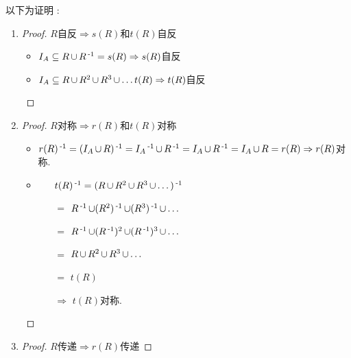 {{{  以下为证明 :

  \begin{enumerate}
    \item {
          \begin{proof}
            $R$自反$\Rightarrow s(R)$和$t(R)$自反

            \begin{itemize}
              \item $I_A \subseteq R \operatorname{\cup} R\operatorname{^{-1}} = s(R) \Rightarrow s(R)$自反
              \item $I_A \subseteq R \operatorname{\cup} R^2 \operatorname{\cup} R^3 \operatorname{\cup} \dots t(R) \Rightarrow t(R)$自反
            \end{itemize}
          \end{proof}
          }
    \item {
          \begin{proof}
            $R$对称$\Rightarrow r(R)$和$t(R)$对称

            \begin{itemize}
              \item $r(R)\operatorname{^{-1}} = (I_A \operatorname{\cup} R)\operatorname{^{-1}} = I_A\operatorname{^{-1}} \operatorname{\cup} R\operatorname{^{-1}} = I_A \operatorname{\cup} R\operatorname{^{-1}} = I_A \operatorname{\cup} R = r(R) \Rightarrow r(R)$对称.
              \item {
                    \begin{itemize}
                      \item[] $t(R)\operatorname{^{-1}} = (R \operatorname{\cup} R^2 \operatorname{\cup} R^3 \operatorname{\cup} \dots)\operatorname{^{-1}}$
                      \item[$=$] $R\operatorname{^{-1}} \operatorname{\cup} (R^2)\operatorname{^{-1}} \operatorname{\cup} (R^3)\operatorname{^{-1}} \operatorname{\cup} \dots$
                      \item[$=$] $R\operatorname{^{-1}} \operatorname{\cup} (R\operatorname{^{-1}})^2 \operatorname{\cup} (R\operatorname{^{-1}})^3 \operatorname{\cup} \dots$
                      \item[$=$] $R \operatorname{\cup} R^2 \operatorname{\cup} R^3 \operatorname{\cup} \dots$
                      \item[$=$] $t(R)$
                      \item[$\Rightarrow$] $t(R)$对称.
                    \end{itemize}
                    }
            \end{itemize}
          \end{proof}
          }
    \item {
          \begin{proof}
            $R$传递$\Rightarrow r(R)$传递


\end{proof}}
\end{enumerate}}}}
